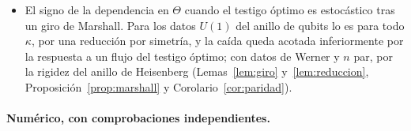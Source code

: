 \documentclass[11pt,a4paper]{article}
\theoremstyle{remark}
\begin{document}
\begin{itemize}
  dato el correlador de Stroganov (Proposición~\ref{prop:rs}; la distancia a $\tfrac12$ es numéricamente
  $\approx2{,}07/n^4$).
\item El signo de la dependencia en $\Theta$ cuando el testigo óptimo es estocástico tras un giro de
  Marshall. Para los datos $U(1)$ del anillo de qubits lo es para todo $\kappa$, por una reducción
  por simetría, y la caída queda acotada inferiormente por la respuesta a un flujo del testigo óptimo; con datos
  de Werner y $n$ par, por la rigidez del anillo de Heisenberg (Lemas~\ref{lem:giro}
  y~\ref{lem:reduccion}, Proposición~\ref{prop:marshall} y Corolario~\ref{cor:paridad}).
\end{itemize}

\paragraph{Numérico, con comprobaciones independientes.}
\end{document}
